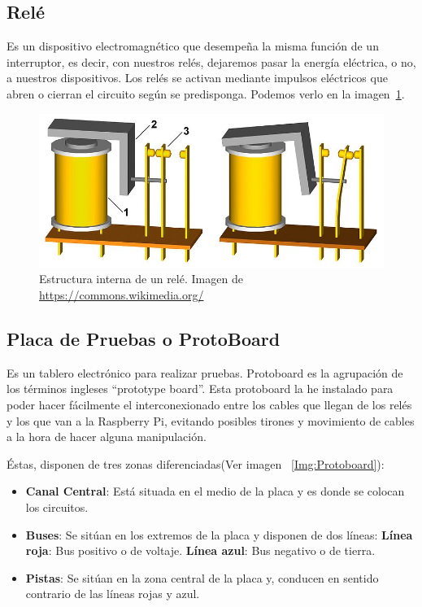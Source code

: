 \subsection{Relé}\label{4:Relé}
Es un dispositivo electromagnético que desempeña la misma función de un interruptor, es decir, con nuestros relés, dejaremos pasar la energía eléctrica, o no, a nuestros dispositivos. Los relés se activan mediante impulsos eléctricos que abren o cierran el circuito según se predisponga. Podemos verlo en la imagen~\ref{Img:Rele1}.
\begin{figure}
    \centering
    \includegraphics[width=\textwidth]{img/Rele_1.jpg}
    \caption[Estructura interna de un relé]{Estructura interna de un relé. Imagen de \url{https://commons.wikimedia.org/}\cite{manual:GNU}} \label{Img:Rele1}
\end{figure}

\subsection{Placa de Pruebas o ProtoBoard}\label{4:protoboard}
Es un tablero electrónico para realizar pruebas. Protoboard es la agrupación de los términos ingleses “prototype board”.
Esta protoboard la he instalado para poder hacer fácilmente el interconexionado entre los cables que llegan de los relés y los que van a la Raspberry Pi, evitando posibles tirones y movimiento de cables a la hora de hacer alguna manipulación.

Éstas, disponen de tres zonas diferenciadas(Ver imagen ~\ref{Img:Protoboard}):

\begin{itemize}
    \item \textbf{Canal Central}: Está situada en el medio de la placa y es donde se colocan los circuitos.
    \item \textbf{Buses}: Se sitúan en los extremos de la placa y disponen de dos líneas:
        \subitem \textbf{Línea roja}: Bus positivo o de voltaje.
        \subitem \textbf{Línea azul}: Bus negativo o de tierra.
    \item \textbf{Pistas}: Se sitúan en la zona central de la placa y, conducen en sentido contrario de las líneas rojas y azul.
\end{itemize}

